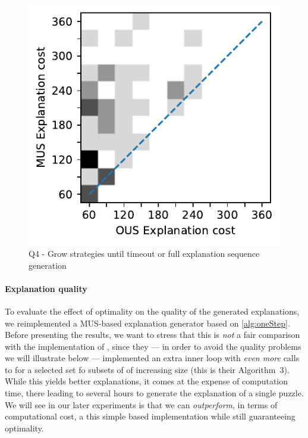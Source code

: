 \begin{figure}[ht]
  \centering
  \includegraphics[width=0.7\columnwidth]{figures/rq1_heatmap.pdf}
  \caption{Q4 - Grow strategies until timeout or full explanation sequence generation}
  \label{fig:rq1_heatmap}
\end{figure}


\paragraph{Explanation quality}\label{paragraph:explanationquality}
To evaluate the effect of optimality on the quality of the generated explanations, we reimplemented a MUS-based explanation generator based on \cref{alg:oneStep}. 
Before presenting the results, we want to stress that this is \emph{not} a fair comparison with the implementation of \citet{ecai/BogaertsGCG20}, since they --- in order to avoid the quality problems we will illustrate below --- implemented an extra inner loop with \emph{even more} calls to  for a selected set fo subsets of \formulac of increasing size (this is their Algorithm~3). 
While this yields better explanations, it comes at the expense of computation time, there leading to several hours to generate the explanation of a single puzzle. 
We will see in our later experiments is that we can \emph{outperform}, in terms of computational cost, a this simple  based implementation while still guaranteeing optimality. 

